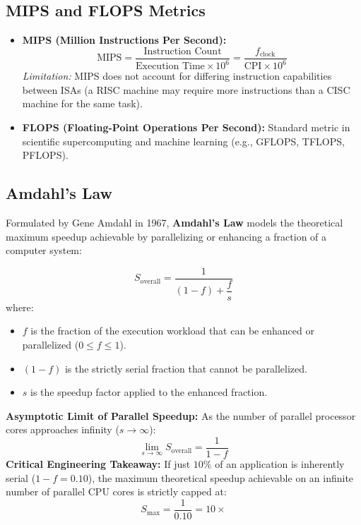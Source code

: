\subsection{MIPS and FLOPS Metrics}
\begin{itemize}
    \item \textbf{MIPS (Million Instructions Per Second):}
    \begin{equation}
    \label{eq:mips_formula}
    \text{MIPS} = \frac{\text{Instruction Count}}{\text{Execution Time} \times 10^6} = \frac{f_{\text{clock}}}{\text{CPI} \times 10^6}
    \end{equation}
    \textit{Limitation:} MIPS does not account for differing instruction capabilities between ISAs (a RISC machine may require more instructions than a CISC machine for the same task).
    \item \textbf{FLOPS (Floating-Point Operations Per Second):} Standard metric in scientific supercomputing and machine learning (e.g., GFLOPS, TFLOPS, PFLOPS).
\end{itemize}

\subsection{Amdahl's Law}
Formulated by Gene Amdahl in 1967, \textbf{Amdahl's Law} models the theoretical maximum speedup achievable by parallelizing or enhancing a fraction of a computer system:

\begin{equation}
\label{eq:amdahls_law}
\boxed{S_{\text{overall}} = \frac{1}{(1 - f) + \dfrac{f}{s}}}
\end{equation}
where:
\begin{itemize}
    \item $f$ is the fraction of the execution workload that can be enhanced or parallelized ($0 \le f \le 1$).
    \item $(1 - f)$ is the strictly serial fraction that cannot be parallelized.
    \item $s$ is the speedup factor applied to the enhanced fraction.
\end{itemize}

\textbf{Asymptotic Limit of Parallel Speedup:}
As the number of parallel processor cores approaches infinity ($s \to \infty$):
\begin{equation}
\label{eq:amdahl_limit}
\lim_{s \to \infty} S_{\text{overall}} = \frac{1}{1 - f}
\end{equation}
\textbf{Critical Engineering Takeaway:} If just $10\%$ of an application is inherently serial ($1 - f = 0.10$), the maximum theoretical speedup achievable on an infinite number of parallel CPU cores is strictly capped at:
\[ S_{\text{max}} = \frac{1}{0.10} = 10\times \]


